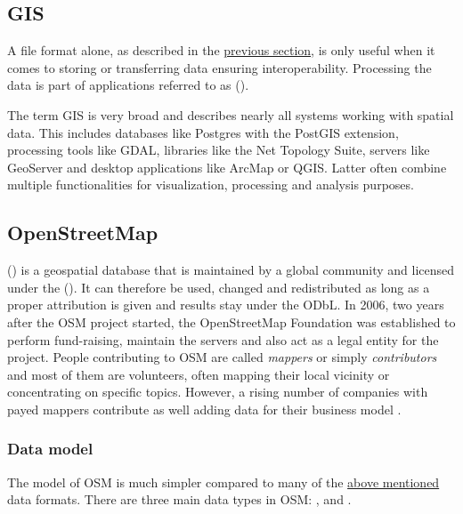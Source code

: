 	\subsection{GIS}
	
		A file format alone, as described in the \hyperref[subsec:file-formats]{previous section}, is only useful when it comes to storing or transferring data ensuring interoperability.
		Processing the data is part of applications referred to as  ().
		
		The term GIS is very broad and describes nearly all systems working with spatial data.
		This includes databases like Postgres with the PostGIS extension, processing tools like GDAL, libraries like the Net Topology Suite, servers like GeoServer and desktop applications like ArcMap or QGIS.
		Latter often combine multiple functionalities for visualization, processing and analysis purposes.
	
	\subsection{OpenStreetMap}
	\label{subsec:osm}
	
		 () is a geospatial database that is maintained by a global community and licensed under the  ()\cite{osm-wiki-about}.
		It can therefore be used, changed and redistributed as long as a proper attribution is given and results stay under the ODbL\cite{odbl-summary}.
		In 2006, two years after the OSM project started, the OpenStreetMap Foundation was established to perform fund-raising, maintain the servers and also act as a legal entity for the project.
		People contributing to OSM are called \textit{mappers} or simply \textit{contributors} and most of them are volunteers, often mapping their local vicinity or concentrating on specific topics.
		However, a rising number of companies with payed mappers contribute as well adding data for their business model \cite{osm-corporate-mappers}.
		
		\subsubsection{Data model}
		
			The model of OSM is much simpler compared to many of the \hyperref[subsec:file-formats]{above mentioned} data formats.
			There are three main data types in OSM: ,  and \cite{osm-wiki-data-model}.
			
